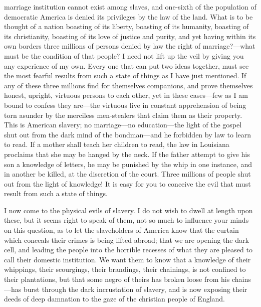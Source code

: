 marriage institution cannot exist among slaves, and one-sixth of the
population of democratic America is denied its privileges by the law of
the land. What is to be thought of a nation boasting of its liberty,
boasting of its humanity, boasting of its christianity, boasting of its
love of justice and purity, and yet having within its own borders three
millions of persons denied by law the right of marriage?---what must be
the condition of that people? I need not lift up the veil by giving you
any experience of my own. Every one that can put two ideas together,
must see the most fearful results from such a state of things as I have
just mentioned. If any of these three millions find for themselves
companions, and prove themselves honest, upright, virtuous persons to
each other, yet in these cases---few as I am bound to confess they
are---the virtuous live in constant apprehension of being torn asunder
by the merciless men-stealers that claim them as their property. This is
American slavery; no marriage---no education---the light of the gospel
shut out from the dark mind of the bondman---and he forbidden by law to
learn to read. If a mother shall teach her children to read, the law in
Louisiana proclaims that she may be hanged by the neck. If the father
attempt to give his son a knowledge of letters, he may be punished by
the whip in one instance, and in another be killed, at the discretion of
the court. Three millions of people shut out from the light of
knowledge! It is easy for you to conceive the evil that must result from
such a state of things.

I now come to the physical evils of slavery. I do not wish to dwell at
length upon these, but it seems right to speak of them, not so much to
influence your minds on this question, as to let the slaveholders of
America know that the curtain which conceals their crimes is being
lifted abroad; that we are opening the dark cell, and leading the people
into the horrible recesses of what they are pleased to call their
domestic institution. We want them to know that a knowledge of their
whippings, their scourgings, their brandings, their chainings, is not
confined to their plantations, but that some negro of theirs has broken
loose from his chains---has burst through the dark incrustation of
slavery, and is now exposing their deeds of deep damnation to the gaze
of the christian people of England.

